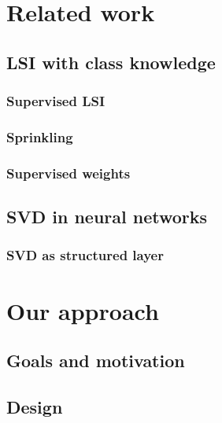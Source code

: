 \* %

\chapter{Related work}
    \section{LSI with class knowledge}
        \subsection{Supervised LSI}
            \cite{sun2004supervised} %

        \subsection{Sprinkling}
            \cite{chakraborti2007supervised} %
        
        \subsection{Supervised weights}
            \cite{wu2017balancing} %
            \cite{ji2013discriminative} %
            \cite{deng2014study} %
            \cite{lan2009supervised} %

    
    \section{SVD in neural networks}
        \subsection{SVD as structured layer} 
            \cite{ionescu2015training} %

    
\chapter{Our approach}
    \section{Goals and motivation}
    \section{Design}
